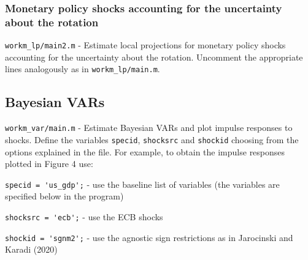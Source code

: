 \documentclass[12pt]{article}
\begin{document}
\subsubsection{Monetary policy shocks accounting for the uncertainty about the rotation}

\verb|workm_lp/main2.m| - Estimate local projections for monetary policy shocks accounting for the uncertainty about the rotation. Uncomment the appropriate lines analogously as  in \verb|workm_lp/main.m|.

\subsection{Bayesian VARs}

\verb|workm_var/main.m| - Estimate Bayesian VARs and plot impulse responses to shocks. Define the variables \verb|specid|, \verb|shocksrc| and \verb|shockid| choosing from the options explained in the file. For example, to obtain the impulse responses plotted in Figure 4 use:

\verb|specid = 'us_gdp';| - use the baseline list of variables (the variables are specified below in the program)

\verb|shocksrc = 'ecb';| - use the ECB shocks

\verb|shockid = 'sgnm2';| - use the agnostic sign restrictions as in Jarocinski and Karadi (2020)

%
%
\end{document}
